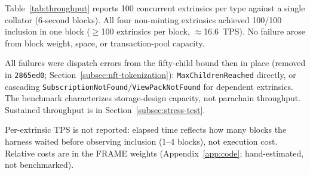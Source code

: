 Table~\ref{tab:throughput} reports 100 concurrent extrinsics per type against a single collator (6-second blocks). All four non-minting extrinsics achieved 100/100 inclusion in one block ($\geq$100 extrinsics per block, $\approx$16.6~TPS). No failure arose from block weight, space, or transaction-pool capacity.

All failures were dispatch errors from the fifty-child bound then in place (removed in \texttt{2865ed0}; Section~\ref{subsec:nft-tokenization}): \texttt{MaxChildrenReached} directly, or cascading \texttt{SubscriptionNotFound}/\texttt{ViewPackNotFound} for dependent extrinsics. The benchmark characterizes storage-design capacity, not parachain throughput. Sustained throughput is in Section~\ref{subsec:stress-test}.

Per-extrinsic TPS is not reported: elapsed time reflects how many blocks the harness waited before observing inclusion (1--4 blocks), not execution cost. Relative costs are in the FRAME weights (Appendix~\ref{app:code}; hand-estimated, not benchmarked).

